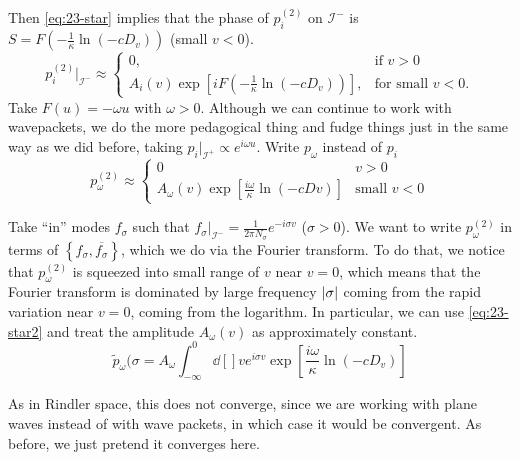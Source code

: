Then \eqref{eq:23-star} implies that the phase of $p_i^{(2)}$ on $\mathscr{I}^-$ is $S = F(-\frac{1}{\kappa} \ln(-c D_v))$ (small $v < 0$).
\begin{equation}
  p_i^{(2)} \rvert_{\mathscr{I}^-} \approx
  \begin{cases}
    0, & \text{if } v > 0 \\
    A_i(v) \exp[i F(-\frac{1}{\kappa} \ln(-c D_v))], & \text{for small }  v < 0.
  \end{cases}
\end{equation}
Take $F(u) = - \omega u$ with $\omega > 0$.
Although we can continue to work with wavepackets, we do the more pedagogical thing and fudge things just in the same way as we did before, taking $p_i \rvert_{\mathscr{I}^+} \propto e^{i \omega u}$.
Write $p_\omega$ instead of $p_i$
\begin{equation}
  \label{eq:23-star2}
  p_{\omega}^{(2)} \approx
  \begin{cases}
    0 & v > 0 \\
    A_\omega (v) \exp[\frac{i \omega}{\kappa} \ln (-c D v)] & \text{small } v < 0
  \end{cases}
\end{equation}

Take ``in'' modes $f_\sigma$ such that $f_{\sigma} \rvert_{\mathscr{I}^-} = \frac{1}{2 \pi N_\sigma} e^{-i \sigma v}$ ($\sigma > 0$).
We want to write $p_\omega^{(2)}$ in terms of $\left\{f_\sigma, \overline{f_\sigma}{}\right\}$, which we do via the Fourier transform. To do that, we notice that $p_\omega^{(2)}$ is squeezed into small range of $v$ near $v = 0$, which means that the Fourier transform is dominated by large frequency $\abs{\sigma}$ coming from the rapid variation near $v = 0$, coming from the logarithm.
In particular, we can use \eqref{eq:23-star2} and treat the amplitude $A_\omega(v)$ as approximately constant.
\begin{equation}
  \label{eq:23-dag}
  \widetilde{p}_{\omega}(\sigma = A_\omega \int_{-\infty}^0 \dd[]{v} e^{i \sigma v} \exp[\frac{i \omega}{\kappa} \ln(- c D_v)]
\end{equation}
\begin{remark}
  As in Rindler space, this does not converge, since we are working with plane waves instead of with wave packets, in which case it would be convergent. As before, we just pretend it converges here.
\end{remark}

